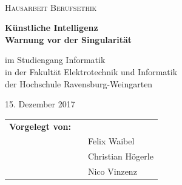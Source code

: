 \begin{figure}[ht]
	\hfill
	\\[1.5cm]
\end{figure}

\begin{center}
	\textsc{\Large{Hausarbeit Berufsethik\\[1.5cm]}}
\end{center}

\begin{center}
	\LARGE{\textbf{
			Künstliche Intelligenz \\
			Warnung vor der Singularität\\[2.0cm]
	}}
\end{center}

\begin{center}
	\small{im Studiengang Informatik}\\
	\small{in der Fakultät Elektrotechnik und Informatik}\\
	\small{der Hochschule Ravensburg-Weingarten}\\[2.0cm]
\end{center}

\begin{center}
	\large{15. Dezember 2017\\[2.0cm]}
\end{center}

\begin{center}
	\begin{tabular}{lll}
		\textbf{Vorgelegt von:}\\
		 & & Felix Waibel\\
		&& Christian Högerle\\
		&& Nico Vinzenz
	\end{tabular}
\end{center}